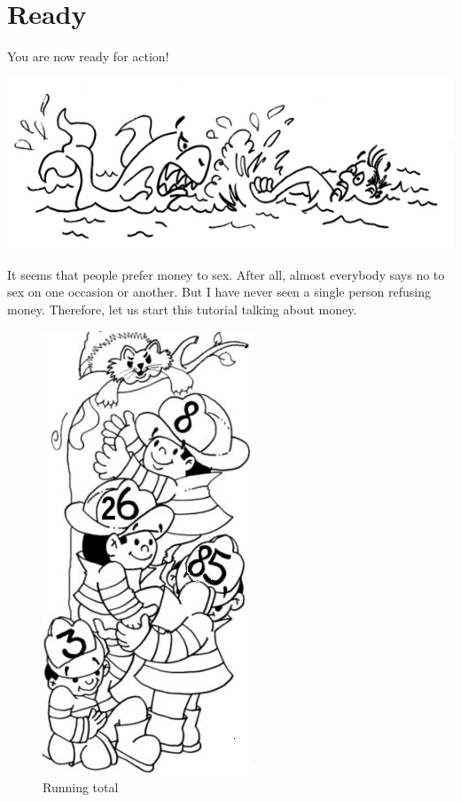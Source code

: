\documentclass[a4paper,12pt]{book}
\begin{document}
\section{Ready}
You are now ready for action!

\includegraphics{figs-prefix/readyforaction.jpg}

It seems that people prefer money to sex.
After all, almost everybody says no to
sex on one occasion or another.
But I have never seen a single
person refusing money. Therefore, let us
start this tutorial talking about money.


\begin{figure}
\renewcommand\figurename{Fig.}
\includegraphics[scale=0.5]{figs-prefix/firemen.png}
\caption{Running total}
\end{figure}
\end{document}
